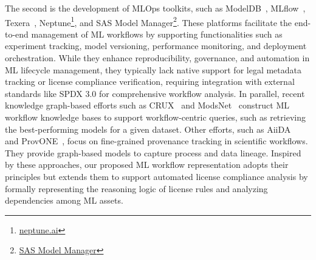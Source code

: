 The second is the development of MLOps toolkits, such as ModelDB~\cite{vartak2018modeldb}, MLflow~\cite{zaharia2018accelerating}, Texera~\cite{wang2024texera, huang2024demonstration}, Neptune\footnote{\href{https://neptune.ai/}{neptune.ai}}, and SAS Model Manager\footnote{\href{https://www.sas.com/en_us/software/model-manager.html}{SAS Model Manager}}. 
These platforms facilitate the end-to-end management of ML workflows by supporting functionalities such as experiment tracking, model versioning, performance monitoring, and deployment orchestration. 
While they enhance reproducibility, governance, and automation in ML lifecycle management, they typically lack native support for legal metadata tracking or license compliance verification, requiring integration with external standards like SPDX 3.0 for comprehensive workflow analysis.
In parallel, recent knowledge graph-based efforts such as CRUX~\cite{wang2022crux} and ModsNet~\cite{wang2023selecting, wang2024modsnet} construct ML workflow knowledge bases to support workflow-centric queries, such as retrieving the best-performing models for a given dataset.
Other efforts, such as AiiDA~\cite{huber2020aiida} and ProvONE~\cite{cao2016provone}, focus on fine-grained provenance tracking in scientific workflows. 
They provide graph-based models to capture process and data lineage. Inspired by these approaches, our proposed ML workflow representation adopts their principles but extends them to support automated license compliance analysis by formally representing the reasoning logic of license rules and analyzing dependencies among ML assets.

